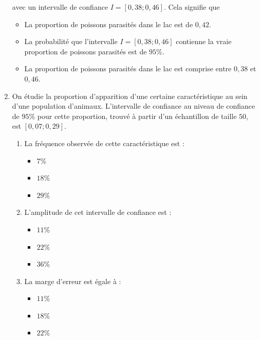 \documentclass[11pt]{article}
\begin{document}
\begin{enumerate}
  avec un intervalle de confiance $I=\left[ 0,38 ; 0,46 \right]$. Cela
  signifie que
  \begin{itemize}[label=$\Box$]
    \item La proportion de poissons parasités dans le lac est de $0,42$.
    \item La probabilité que l'intervalle $I=\left[ 0,38 ; 0,46 \right]$
      contienne la vraie proportion de poissons parasités est de $95$\%.
    \item La proportion de poissons parasités dans le lac est comprise entre
      $0,38$ et $0,46$.
  \end{itemize}
\item On étudie la proportion d'apparition d'une certaine caractéristique au
  sein d'une population d'animaux. L'intervalle de confiance au niveau de
  confiance de $95$\% pour cette proportion, trouvé à partir d'un échantillon de
  taille $50$, est $\left[ 0,07 ; 0,29 \right]$.
  \begin{enumerate}
    \item La fréquence observée de cette caractéristique est :
      \begin{multicols}{3}
        \begin{itemize}[label=$\Box$]
          \item $7$\%
          \item $18$\%
          \item $29$\%
        \end{itemize}
      \end{multicols}
    \item L'amplitude de cet intervalle de confiance est :
      \begin{multicols}{3}
        \begin{itemize}[label=$\Box$]
          \item $11$\%
          \item $22$\%
          \item $36$\%
        \end{itemize}
      \end{multicols}
    \item La marge d'erreur est égale à :
      \begin{multicols}{3}
        \begin{itemize}[label=$\Box$]
          \item $11$\%
          \item $18$\%
          \item $22$\%
        \end{itemize}

\end{multicols}
\end{enumerate}
\end{enumerate}
\end{document}
